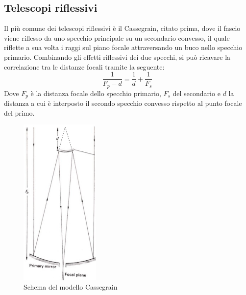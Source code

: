 \documentclass[a4paper,twoside,openany,notitlepage]{book}
\theoremstyle{definition}
\theoremstyle{plain}
\begin{document}

\subsection{Telescopi riflessivi}

Il più comune dei telescopi riflessivi è il Cassegrain, citato prima, dove il fascio viene riflesso da uno specchio principale su un secondario convesso, il quale riflette a sua volta i raggi sul piano focale attraversando un buco nello specchio primario. Combinando gli effetti riflessivi dei due specchi, si può ricavare la correlazione tra le distanze focali tramite la seguente:
\begin{equation*}
	\frac{1}{F_p-d}=\frac{1}{d}+\frac{1}{F_s}
\end{equation*}
Dove $F_p$ è la distanza focale dello specchio primario, $F_s$ del secondario e $d$ la distanza a cui è interposto il secondo specchio convesso rispetto al punto focale del primo.

\begin{figure}
	\vspace{-10pt}
	\centering
	\includegraphics[width=0.35\textwidth]{Immagini/Capitolo2/Cassegrain.PNG}
	\caption*{Schema del modello Cassegrain}
	\vspace{-20pt}
\end{figure}
\end{document}
